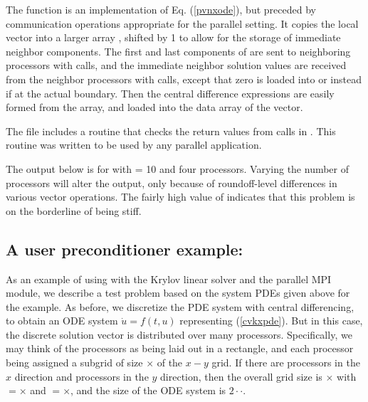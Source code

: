 The  function is an implementation of Eq. (\ref{pvnxode}), but preceded
by communication operations appropriate for the parallel setting.
It copies the local vector  into a larger array , shifted by 1
to allow for the storage of immediate neighbor components.  The first and last
components of  are sent to neighboring processors with  calls,
and the immediate neighbor solution values are received from the neighbor
processors with  calls, except that zero is loaded into 
or  instead if at the actual boundary.  Then the central
difference expressions are easily formed from the  array, and loaded into
the data array of the  vector.

The  file includes a routine  that checks the
return values from calls in .  This routine was written to be used
by any parallel {\sundials} application.

The output below is for  with  = 10 and four processors. 
Varying the number of processors will alter the output, only because
of roundoff-level differences in various vector operations.  The fairly
high value of  indicates that this problem is on the borderline
of being stiff.



\subsection{A user preconditioner example: }\label{ss:pvkx}

As an example of using {\cvode} with the Krylov linear solver
{\cvspgmr} and the parallel MPI {\nvecp} module, we describe a test
problem based on the system PDEs given above for the  example.  
As before, we discretize the PDE system with central differencing, to
obtain an ODE system $\dot{u} = f(t,u)$ representing (\ref{cvkxpde}).  
But in this case, the discrete solution vector is distributed over
many processors.  Specifically, we may think of the processors as
being laid out in a rectangle, and each processor being assigned a
subgrid of size $\times$ of the $x-y$ grid. If
there are  processors in the $x$ direction and 
processors in the $y$ direction, then the overall grid size is
$\times$ with $=$$\times$ and
$=$$\times$, and the size of the ODE system is
$2\cdot$$\cdot$.  

